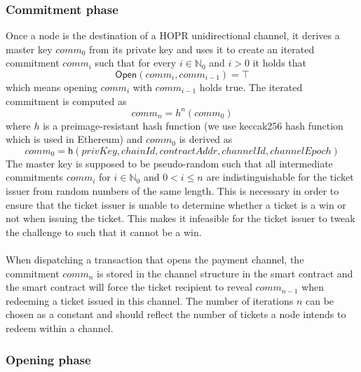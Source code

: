 \subsubsection{Commitment phase}

Once a node is the destination of a HOPR unidirectional channel, it derives a master key $comm_0$ from its private key and uses it to create an iterated commitment $comm_i$ such that for every $i \in \mathbb{N}_0$ and $i > 0$ it holds that $$ \mathsf{Open}(comm_{i}, comm_{i-1}) = \top $$
which means opening $comm_{i}$ with $comm_{i-1}$ holds true.
The iterated commitment is computed as $$comm_n = h^n(comm_0)$$ where $h$ is a preimage-resistant hash function (we use keccak256 hash function which is used in Ethereum) and $comm_0$ is derived as 
$$ comm_0 = \mathsf{h}(privKey,chainId, contractAddr, channelId, channelEpoch)$$
The master key is supposed to be pseudo-random such that all intermediate commitments $comm_{i}$ for $i \in \mathbb{N}_0$ and $0 < i \le n$ are indistinguishable for the ticket issuer from random numbers of the same length. This is necessary in order to ensure that the ticket issuer is unable to determine whether a ticket is a win or not when issuing the ticket. This makes it infeasible for the ticket issuer to tweak the challenge to such that it cannot be a win.
\\~\\When dispatching a transaction that opens the payment channel, the commitment $comm_n$ is stored in the channel structure in the smart contract and the smart contract will force the ticket recipient to reveal $comm_{n-1}$ when redeeming a ticket issued in this channel.
The number of iterations $n$ can be chosen as a constant and should reflect the number of tickets a node intends to redeem within a channel.

\subsubsection{Opening phase}

